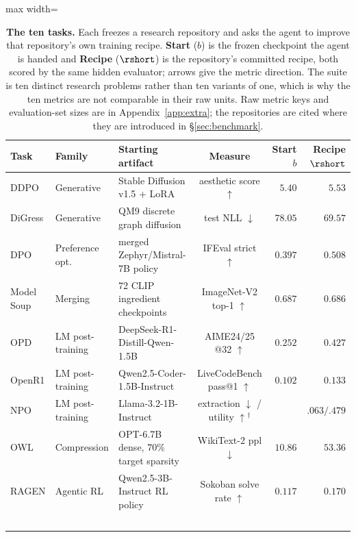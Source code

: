 \begin{table}[t]
\centering
\caption{\textbf{The ten \ai{} tasks.} Each freezes a research repository and asks the agent to
improve that repository's own training recipe. \textbf{Start} ($b$) is the frozen checkpoint the
agent is handed and \textbf{Recipe} ($\rshort$) is the repository's committed recipe, both scored
by the same hidden evaluator; arrows give the metric direction. The suite is ten distinct research
problems rather than ten variants of one, which is why the ten metrics are not comparable in their
raw units. Raw metric keys and evaluation-set sizes are in Appendix~\ref{app:extra}; the repositories are cited where they are introduced in \S\ref{sec:benchmark}.}
\label{tab:tasks}
\small
\begin{adjustbox}{max width=\linewidth}
\begin{tabular}{lllcrr}
\toprule
\textbf{Task} & \textbf{Family} & \textbf{Starting artifact} & \textbf{Measure} & \textbf{Start $b$} & \textbf{Recipe $\rshort$} \\
\midrule
DDPO       & Generative       & Stable Diffusion v1.5 + LoRA        & aesthetic score $\uparrow$      & $5.40$   & $5.53$   \\
DiGress    & Generative       & QM9 discrete graph diffusion        & test NLL $\downarrow$           & $78.05$  & $69.57$  \\
DPO        & Preference opt.\ & merged Zephyr/Mistral-7B policy      & IFEval strict $\uparrow$        & $0.397$  & $0.508$  \\
Model Soup & Merging          & 72 CLIP ingredient checkpoints      & ImageNet-V2 top-1 $\uparrow$    & $0.687$  & $0.686$  \\
OPD        & LM post-training & DeepSeek-R1-Distill-Qwen-1.5B       & AIME24/25 @32 $\uparrow$        & $0.252$  & $0.427$  \\
OpenR1     & LM post-training & Qwen2.5-Coder-1.5B-Instruct         & LiveCodeBench pass@1 $\uparrow$ & $0.102$  & $0.133$  \\
NPO        & LM post-training & Llama-3.2-1B-Instruct               & extraction $\downarrow$ / utility $\uparrow$$^{\dagger}$ & \na{}    & $.063/.479$ \\
OWL        & Compression      & OPT-6.7B dense, $70\%$ target sparsity & WikiText-2 ppl $\downarrow$  & $10.86$  & $53.36$  \\
RAGEN      & Agentic RL       & Qwen2.5-3B-Instruct RL policy       & Sokoban solve rate $\uparrow$   & $0.117$  & $0.170$  \\
$$
\end{tabular}
\end{adjustbox}
\end{table}
